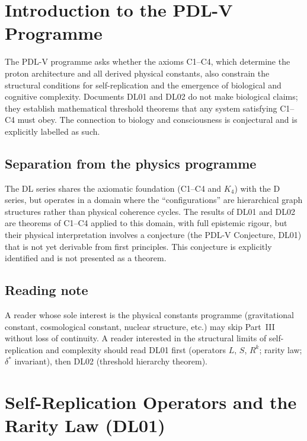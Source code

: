 \documentclass[11pt,a4paper]{article}
\theoremstyle{plain}
\theoremstyle{definition}
\theoremstyle{remark}
\begin{document}
\vspace{1em}

\section{Introduction to the PDL-V Programme}
\label{sec:PDLV_intro}

The PDL-V programme asks whether the axioms C1--C4, which determine the proton architecture and all derived physical constants, also constrain the structural conditions for self-replication and the emergence of biological and cognitive complexity. Documents DL01 and DL02 do not make biological claims; they establish mathematical threshold theorems that any system satisfying C1--C4 must obey. The connection to biology and consciousness is conjectural and is explicitly labelled as such.

\subsection{Separation from the physics programme}

The DL series shares the axiomatic foundation (C1--C4 and $K_4$) with the D series, but operates in a domain where the ``configurations'' are hierarchical graph structures rather than physical coherence cycles. The results of DL01 and DL02 are theorems of C1--C4 applied to this domain, with full epistemic rigour, but their physical interpretation involves a conjecture (the PDL-V Conjecture, DL01) that is not yet derivable from first principles. This conjecture is explicitly identified and is not presented as a theorem.

\subsection{Reading note}

A reader whose sole interest is the physical constants programme (gravitational constant, cosmological constant, nuclear structure, etc.) may skip Part~III without loss of continuity. A reader interested in the structural limits of self-replication and complexity should read DL01 first (operators $L$, $S$, $R^k$; rarity law; $\delta^*$ invariant), then DL02 (threshold hierarchy theorem).

\section{Self-Replication Operators and the Rarity Law (DL01)}
\label{sec:DL01}
\end{document}
